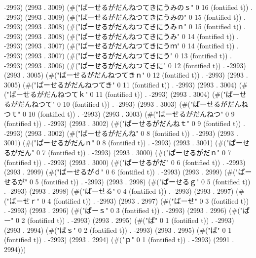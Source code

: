 -2993) (2993 . 3009) (#("ぱーせるがだんねつてきにうみのｓ" 0 16 (fontified t)) . -2993) (2993 . 3009) (#("ぱーせるがだんねつてきにうみの" 0 15 (fontified t)) . -2993) (2993 . 3008) (#("ぱーせるがだんねつてきにうみｎ" 0 15 (fontified t)) . -2993) (2993 . 3008) (#("ぱーせるがだんねつてきにうみ" 0 14 (fontified t)) . -2993) (2993 . 3007) (#("ぱーせるがだんねつてきにうｍ" 0 14 (fontified t)) . -2993) (2993 . 3007) (#("ぱーせるがだんねつてきにう" 0 13 (fontified t)) . -2993) (2993 . 3006) (#("ぱーせるがだんねつてきに" 0 12 (fontified t)) . -2993) (2993 . 3005) (#("ぱーせるがだんねつてきｎ" 0 12 (fontified t)) . -2993) (2993 . 3005) (#("ぱーせるがだんねつてき" 0 11 (fontified t)) . -2993) (2993 . 3004) (#("ぱーせるがだんねつてｋ" 0 11 (fontified t)) . -2993) (2993 . 3004) (#("ぱーせるがだんねつて" 0 10 (fontified t)) . -2993) (2993 . 3003) (#("ぱーせるがだんねつｔ" 0 10 (fontified t)) . -2993) (2993 . 3003) (#("ぱーせるがだんねつ" 0 9 (fontified t)) . -2993) (2993 . 3002) (#("ぱーせるがだんねｔ" 0 9 (fontified t)) . -2993) (2993 . 3002) (#("ぱーせるがだんね" 0 8 (fontified t)) . -2993) (2993 . 3001) (#("ぱーせるがだんｎ" 0 8 (fontified t)) . -2993) (2993 . 3001) (#("ぱーせるがだん" 0 7 (fontified t)) . -2993) (2993 . 3000) (#("ぱーせるがだｎ" 0 7 (fontified t)) . -2993) (2993 . 3000) (#("ぱーせるがだ" 0 6 (fontified t)) . -2993) (2993 . 2999) (#("ぱーせるがｄ" 0 6 (fontified t)) . -2993) (2993 . 2999) (#("ぱーせるが" 0 5 (fontified t)) . -2993) (2993 . 2998) (#("ぱーせるｇ" 0 5 (fontified t)) . -2993) (2993 . 2998) (#("ぱーせる" 0 4 (fontified t)) . -2993) (2993 . 2997) (#("ぱーせｒ" 0 4 (fontified t)) . -2993) (2993 . 2997) (#("ぱーせ" 0 3 (fontified t)) . -2993) (2993 . 2996) (#("ぱーｓ" 0 3 (fontified t)) . -2993) (2993 . 2996) (#("ぱー" 0 2 (fontified t)) . -2993) (2993 . 2995) (#("ぱ" 0 1 (fontified t)) . -2993) (2993 . 2994) (#("ぱｓ" 0 2 (fontified t)) . -2993) (2993 . 2995) (#("ぱ" 0 1 (fontified t)) . -2993) (2993 . 2994) (#("ｐ" 0 1 (fontified t)) . -2993) (2991 . 2994)))
